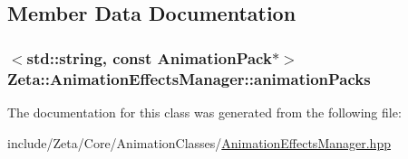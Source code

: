 \subsection{Member Data Documentation}
\hypertarget{classZeta_1_1AnimationEffectsManager_a3850f148abb88205f126e936cea09266}{
\subsubsection[{animation\+Packs}]{$<$std\+::string, const {\bf Animation\+Pack}$\ast$$>$ Zeta\+::\+Animation\+Effects\+Manager\+::animation\+Packs\hspace{0.3cm}{\ttfamily [private]}}}\label{classZeta_1_1AnimationEffectsManager_a3850f148abb88205f126e936cea09266}


The documentation for this class was generated from the following file\+:\begin{DoxyCompactItemize}
\item 
include/\+Zeta/\+Core/\+Animation\+Classes/\hyperlink{AnimationEffectsManager_8hpp}{Animation\+Effects\+Manager.\+hpp}\end{DoxyCompactItemize}
